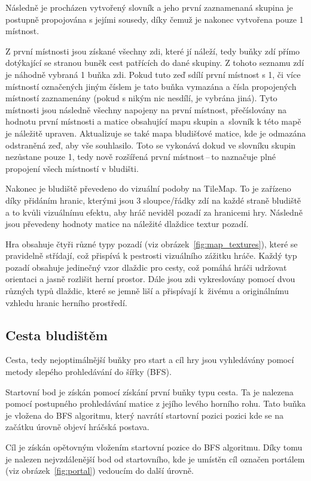 Následně je procházen vytvořený slovník a jeho první zaznamenaná skupina je postupně propojována s jejími sousedy, díky čemuž je nakonec vytvořena pouze 1 místnost. 

Z první místnosti jsou získané všechny zdi, které jí náleží, tedy buňky zdí přímo dotýkající se stranou buněk cest patřících do dané skupiny. Z tohoto seznamu zdí je náhodně vybraná 1 buňka zdi. Pokud tuto zeď sdílí první místnost s 1, či více místností označených jiným číslem je tato buňka vymazána a čísla propojených místností zaznamenány (pokud s nikým nic nesdílí, je vybrána jiná). Tyto místnosti jsou následně všechny napojeny na první místnost, přečíslovány na hodnotu první místnosti a matice obsahující mapu skupin a~slovník k této mapě je náležitě upraven. Aktualizuje se také mapa bludišťové matice, kde je odmazána odstraněná zeď, aby vše souhlasilo. Toto se vykonává dokud ve slovníku skupin nezůstane pouze 1, tedy nově rozšířená první místnost\,--\,to naznačuje plné propojení všech místností v bludišti.

Nakonec je bludiště převedeno do vizuální podoby na TileMap. To je zařízeno díky přidáním hranic, kterými jsou 3 sloupce/řádky zdí na každé straně bludiště a to kvůli vizuálnímu efektu, aby hráč neviděl pozadí za hranicemi hry. Následně jsou převedeny hodnoty matice na náležité dlaždice textur pozadí. 

Hra obsahuje čtyři různé typy pozadí (viz obrázek~\ref{fig:map_textures}), které se pravidelně střídají, což přispívá k pestrosti vizuálního zážitku hráče. Každý typ pozadí obsahuje jedinečný vzor dlaždic pro cesty, což pomáhá hráči udržovat orientaci a jasně rozlišit herní prostor. Dále jsou zdi vykreslovány pomocí dvou různých typů dlaždic, které se jemně liší a přispívají k~živému a originálnímu vzhledu hranic herního prostředí.

\subsection*{Cesta bludištěm} 
Cesta, tedy nejoptimálnější buňky pro start a cíl hry jsou vyhledávány pomocí metody slepého prohledávání do šířky (BFS). 

Startovní bod je získán pomocí získání první buňky typu cesta. Ta je nalezena pomocí postupného prohledávání matice z jejího levého horního rohu. Tato buňka je vložena do BFS algoritmu, který navrátí startovní pozici pozici kde se na začátku úrovně objeví hráčská postava.

Cíl je získán opětovným vložením startovní pozice do BFS algoritmu. Díky tomu je nalezen nejvzdálenější bod od startovního, kde je umístěn cíl označen portálem (viz obrázek~\ref{fig:portal}) vedoucím do další úrovně.

